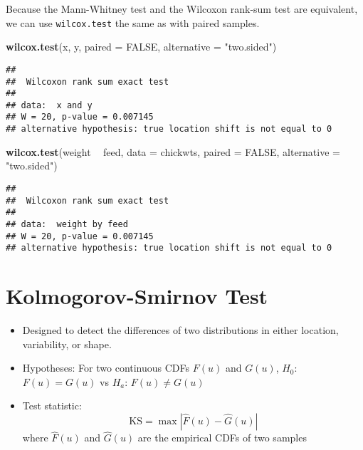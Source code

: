 \documentclass[
]{book}
\newenvironment{Shaded}{\begin{snugshade}}{\end{snugshade}}
\newcommand{\DataTypeTok}[1]{\textcolor[rgb]{0.13,0.29,0.53}{#1}}
\newcommand{\KeywordTok}[1]{\textcolor[rgb]{0.13,0.29,0.53}{\textbf{#1}}}
\newcommand{\NormalTok}[1]{#1}
\newcommand{\OperatorTok}[1]{\textcolor[rgb]{0.81,0.36,0.00}{\textbf{#1}}}
\newcommand{\OtherTok}[1]{\textcolor[rgb]{0.56,0.35,0.01}{#1}}
\newcommand{\StringTok}[1]{\textcolor[rgb]{0.31,0.60,0.02}{#1}}
\providecommand{\tightlist}{%
  \setlength{\itemsep}{0pt}\setlength{\parskip}{0pt}}
\begin{document}
Because the Mann-Whitney test and the
Wilcoxon rank-sum test are equivalent,
we can use \texttt{wilcox.test} the same as with paired samples.

\begin{Shaded}
\begin{Highlighting}[]
\KeywordTok{wilcox.test}\NormalTok{(x, y, }\DataTypeTok{paired =} \OtherTok{FALSE}\NormalTok{, }\DataTypeTok{alternative =} \StringTok{"two.sided"}\NormalTok{)}
\end{Highlighting}
\end{Shaded}

\begin{verbatim}
## 
##  Wilcoxon rank sum exact test
## 
## data:  x and y
## W = 20, p-value = 0.007145
## alternative hypothesis: true location shift is not equal to 0
\end{verbatim}

\begin{Shaded}
\begin{Highlighting}[]
\KeywordTok{wilcox.test}\NormalTok{(weight }\OperatorTok{~}\StringTok{ }\NormalTok{feed, }\DataTypeTok{data =}\NormalTok{ chickwts,}
            \DataTypeTok{paired =} \OtherTok{FALSE}\NormalTok{, }\DataTypeTok{alternative =} \StringTok{"two.sided"}\NormalTok{)}
\end{Highlighting}
\end{Shaded}

\begin{verbatim}
## 
##  Wilcoxon rank sum exact test
## 
## data:  weight by feed
## W = 20, p-value = 0.007145
## alternative hypothesis: true location shift is not equal to 0
\end{verbatim}

\hypertarget{kolmogorov-smirnov-test}{%
\section{Kolmogorov-Smirnov Test}\label{kolmogorov-smirnov-test}}

\begin{itemize}
\tightlist
\item
  Designed to detect the differences of two distributions
  in either location, variability, or shape.
\item
  Hypotheses:
  For two continuous CDFs \(F(u)\) and \(G(u)\),
  \(H_0\): \(F(u) = G(u)\) vs \(H_a\): \(F(u) \neq G(u)\)
\item
  Test statistic:
  \[\mathrm{KS} = \max \left| \hat{F}(u) - \hat{G}(u) \right|\]
  where \(\hat{F}(u)\) and \(\hat{G}(u)\) are the
  empirical CDFs of two samples
\end{itemize}
\end{document}
